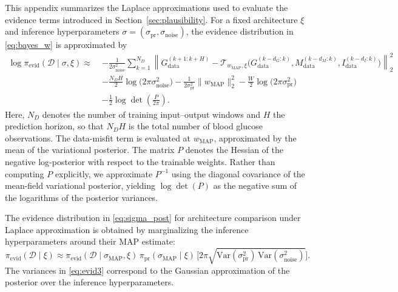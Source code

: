 \documentclass[preprint,12pt]{elsarticle}
\begin{document}
This appendix summarizes the Laplace approximations used to evaluate the evidence terms introduced in Section~\ref{sec:plausibility}. 
For a fixed architecture \(\xi\) and inference hyperparameters
\(\sigma=(\sigma_{\mathrm{pr}},\sigma_{\mathrm{noise}})\), the evidence distribution in \eqref{eq:bayes_w} is approximated by
\begin{align}
\log \pi_{\mathrm{evid}}(\mathcal{D}\mid \sigma,\xi)
\approx\;&
-\frac{1}{2\sigma_{\mathrm{noise}}^{2}}
\sum_{k=1}^{N_D}
\left\|
G_{\mathrm{data}}^{(k+1:k+H)}
-
\mathcal{T}_{w_{\mathrm{MAP}},\xi}
\!\big(
G_{\mathrm{data}}^{(k-d_G:k)},
M_{\mathrm{data}}^{(k-d_M:k)},
I_{\mathrm{data}}^{(k-d_I:k)}
\big)
\right\|_2^{2}
\nonumber\\
&-\frac{N_D H}{2}\log\!\big(2\pi\sigma_{\mathrm{noise}}^{2}\big)
-\frac{1}{2\sigma_{\mathrm{pr}}^{2}}\|w_{\mathrm{MAP}}\|_2^{2}
-\frac{W}{2}\log\!\big(2\pi\sigma_{\mathrm{pr}}^{2}\big)
\nonumber\\
&-\frac{1}{2}\log\det\!\left(\frac{P}{2\pi}\right).
\label{eq:log_evid}
\end{align}
%
Here, \(N_D\) denotes the number of training input--output windows and \(H\) the prediction horizon, so that \(N_DH\) is the total number of blood glucose observations. The data-misfit term is evaluated at \(w_{\mathrm{MAP}}\), approximated by the mean of the variational posterior.
%
The matrix \(P\) denotes the Hessian of the negative log-posterior with respect to the trainable weights. Rather than computing \(P\) explicitly, we approximate \(P^{-1}\) using the diagonal covariance of the mean-field variational posterior, yielding \(\log\det(P)\) as the negative sum of the logarithms of the posterior variances.

%

The evidence distribution in \eqref{eq:sigma_post} for architecture comparison under Laplace approximation is obtained by marginalizing the inference hyperparameters around their MAP estimate:
\begin{equation}
\pi_{\mathrm{evid}}(\mathcal{D}\mid \xi)
\approx
\pi_{\mathrm{evid}}(\mathcal{D}\mid \sigma_{\mathrm{MAP}},\xi)\,
\pi_{\mathrm{pr}}(\sigma_{\mathrm{MAP}}\mid \xi)\,
\Big[
2\pi\sqrt{
\mathrm{Var}(\sigma_{\mathrm{pr}}^{2})\,
\mathrm{Var}(\sigma_{\mathrm{noise}}^{2})
}
\Big].
\label{eq:evid3}
\end{equation}
The variances in \eqref{eq:evid3} correspond to the Gaussian approximation of the posterior over the inference hyperparameters.
\end{document}
